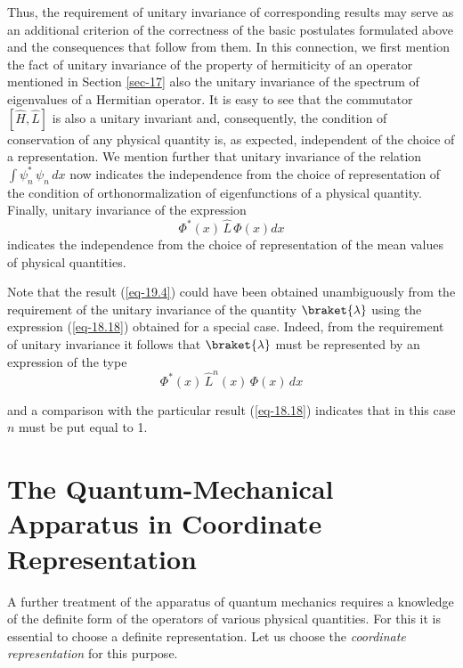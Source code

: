 \documentclass[a4paper,sfsidenotes,colorlinks=true]{tufte-book}
\numberwithin{equation}{section}
\numberwithin{figure}{section}
\begin{document}
Thus, the requirement of unitary invariance of corresponding results
may serve as an additional criterion of the correctness of the basic
postulates formulated above and the consequences that follow from
them. In this connection, we first mention the fact of unitary
invariance of the property of hermiticity of an operator mentioned in
Section \ref{sec-17} also the unitary invariance of the spectrum of
eigenvalues of a Hermitian operator. It is easy to see that the
commutator $\left[ \hat{H}, \hat{L} \right]$ is also a unitary
invariant and, consequently, the condition of conservation of any
physical quantity is, as expected, independent of the choice of a
representation. We mention further that unitary invariance of the
relation $\int \psi^{*}_{n} \, \psi_{n} \, dx $ now indicates the
independence from the choice of representation of the condition of
orthonormalization of eigenfunctions of a physical quantity. Finally,
unitary invariance of the expression 
\begin{equation*}
\Phi^{*} (x) \, \hat{L} \, \Phi(x) dx
\end{equation*}
indicates the independence from the choice of representation of the
mean values of physical quantities.

Note that the result (\ref{eq-19.4}) could have been obtained
unambiguously from the requirement of the unitary invariance of the
quantity $\braket{\lambda}$ using the expression (\ref{eq-18.18})
obtained for a special case. Indeed, from the requirement of unitary
invariance it follows that $\braket{\lambda}$ must be represented by
an expression of the type 
\begin{equation*}
\Phi^{*} (x) \, \hat{L}^{n}(x) \, \Phi (x) \, dx 
\end{equation*}

and a comparison with the particular result (\ref{eq-18.18}) indicates that in
this case $n$ must be put equal to 1.







\section{The Quantum-Mechanical Apparatus in Coordinate
  Representation}
\label{sec-20}



A further treatment of the apparatus of quantum mechanics requires a
knowledge of the definite form of the operators of various physical
quantities. For this it is essential to choose a definite
representation. Let us choose the \emph{coordinate representation} for
this purpose.
\end{document}
